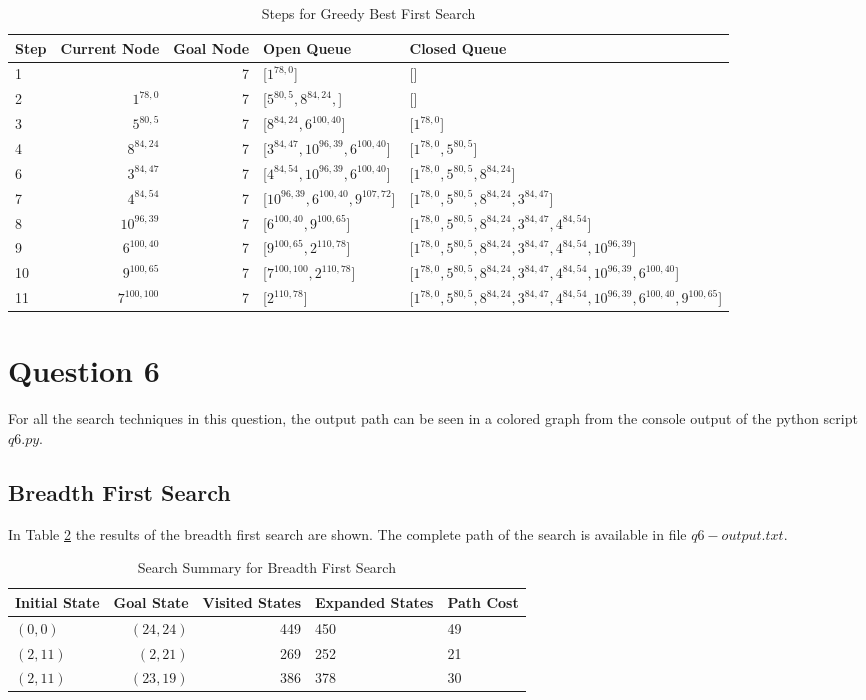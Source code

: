 \documentclass{article}
\begin{document}
    \begin{table}[!htp]\centering
        \caption{Steps for Greedy Best First Search}\label{tab:a*5}
        \scriptsize
        \begin{tabular}{lrrll}\toprule
        Step &Current Node &Goal Node & Open Queue &Closed Queue  \\\midrule
        1&  &7 &[$1^{78,0}$] &[] \\
        2& $1^{78,0}$ &7 &[$5^{80,5}, 8^{84,24}, $] &[] \\
        3& $5^{80,5}$ &7 &[$8^{84,24}, 6^{100, 40}$] &[$1^{78,0}$] \\
        4& $8^{84,24}$ &7 &[$3^{84,47}, 10^{96,39}, 6^{100, 40}$] &[$1^{78,0}, 5^{80,5}$] \\
        6& $3^{84,47}$ &7 &[$4^{84,54}, 10^{96,39}, 6^{100, 40}$] &[$1^{78,0}, 5^{80,5}, 8^{84,24}$] \\
        7& $4^{84,54}$ &7 &[$10^{96,39}, 6^{100, 40}, 9^{107,72}$] &[$1^{78,0}, 5^{80,5}, 8^{84,24}, 3^{84,47}$] \\
        8& $10^{96,39}$ &7 &[$6^{100, 40}, 9^{100,65}$] &[$1^{78,0}, 5^{80,5}, 8^{84,24}, 3^{84,47}, 4^{84,54}$] \\
        9& $6^{100, 40}$ &7 &[$9^{100,65}, 2^{110,78}$] &[$1^{78,0}, 5^{80,5}, 8^{84,24}, 3^{84,47}, 4^{84,54}, 10^{96,39}$] \\
        10& $9^{100,65}$ &7 &[$7^{100,100}, 2^{110,78}$] &[$1^{78,0}, 5^{80,5}, 8^{84,24}, 3^{84,47}, 4^{84,54}, 10^{96,39}, 6^{100, 40}$] \\
        11& $7^{100,100}$ &7 &[$2^{110,78}$] &[$1^{78,0}, 5^{80,5}, 8^{84,24}, 3^{84,47}, 4^{84,54}, 10^{96,39}, 6^{100, 40}, 9^{100,65}$] \\
        \end{tabular}
    \end{table}
\section{Question 6}
For all the search techniques in this question, the output path can be seen in a colored graph from the console output of the python script $q6.py$.
\subsection{Breadth First Search}
    In Table \ref{tab:bfs6} the results of the breadth first search are shown. The complete path of the search is available in file $q6-output.txt$.
    \begin{table}[!htp]\centering
        \caption{Search Summary for Breadth First Search}\label{tab:bfs6}
        \scriptsize
        \begin{tabular}{lrrll}\toprule
        Initial State &Goal State &Visited States&Expanded States&Path Cost  \\\midrule
        $(0,0)$ & $(24,24)$ & 449 & 450 & 49 \\
        $(2, 11)$ & $(2, 21)$ & 269 & 252 & 21 \\
        $(2, 11)$ & $(23, 19)$ & 386 & 378 & 30 \\
    \end{tabular}
    \end{table}
\end{document}
